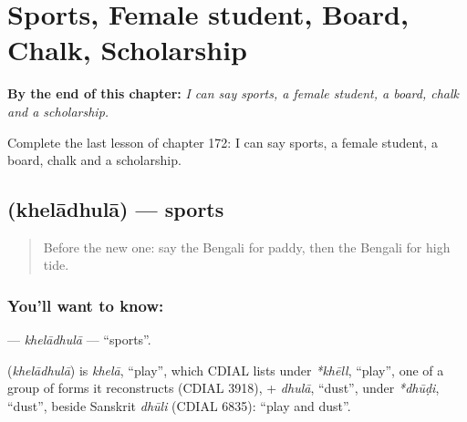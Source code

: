 
\chapter{Sports, Female student, Board, Chalk, Scholarship}
\label{ch:bn-sports-female-student-board-chalk-scholarship}

\begin{chapteropening}
\textbf{By the end of this chapter:} \emph{I can say sports, a female student, a board, chalk and a scholarship.}

Complete the last lesson of chapter 172: I can say sports, a female student, a board, chalk and a scholarship.
\end{chapteropening}

\section[\texorpdfstring{\bn{খেলাধুলা} (khelādhulā)}{খেলাধুলা (khelādhulā)}]{ (khelādhulā) — sports}

\label{lesson:BN-C172-kheladhula}



\begin{quote}
Before the new one: say the Bengali for paddy, then the Bengali for high tide.
\end{quote}

\subsection*{You'll want to know: }
\textbf{} — \emph{khelādhulā} — \textquotedblleft{}sports\textquotedblright{}.

\begin{cousinweb}
\textbf{} (\emph{khelādhulā}) is \emph{khelā}, \textquotedblleft{}play\textquotedblright{}, which CDIAL lists under \emph{*khēll}, \textquotedblleft{}play\textquotedblright{}, one of a group of forms it reconstructs (CDIAL 3918), + \emph{dhulā}, \textquotedblleft{}dust\textquotedblright{}, under \emph{*dhūḍi}, \textquotedblleft{}dust\textquotedblright{}, beside Sanskrit \emph{dhūli} (CDIAL 6835): \textquotedblleft{}play and dust\textquotedblright{}.
\end{cousinweb}

